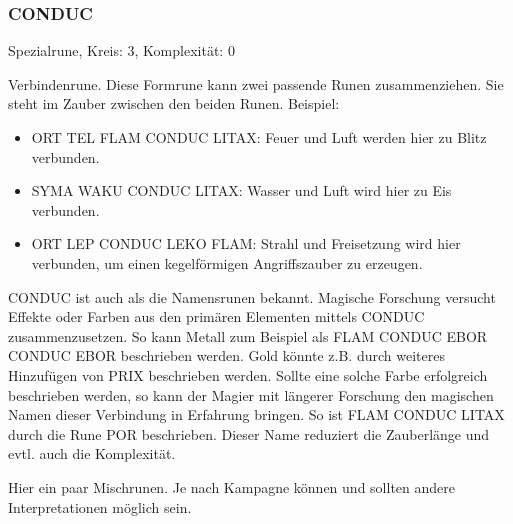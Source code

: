 \documentclass{article}
\begin{document}
\subsubsection{CONDUC}

Spezialrune, Kreis: 3, Komplexität: 0

Verbindenrune. Diese Formrune kann zwei passende Runen zusammenziehen. Sie steht im Zauber zwischen den beiden Runen.
Beispiel:

\begin{itemize}
\item ORT TEL FLAM CONDUC LITAX: Feuer und Luft werden hier zu Blitz verbunden.
\item SYMA WAKU CONDUC LITAX: Wasser und Luft wird hier zu Eis verbunden.
\item ORT LEP CONDUC LEKO FLAM: Strahl und Freisetzung wird hier verbunden, um einen kegelförmigen Angriffszauber zu erzeugen.
\end{itemize}

CONDUC ist auch als die Namensrunen bekannt. Magische Forschung versucht Effekte oder Farben aus den primären
Elementen mittels CONDUC zusammenzusetzen. So kann Metall zum Beispiel als FLAM CONDUC EBOR CONDUC EBOR beschrieben
werden. Gold könnte z.B. durch weiteres Hinzufügen von PRIX beschrieben werden. Sollte eine solche Farbe erfolgreich
beschrieben werden, so kann der Magier mit längerer Forschung den magischen Namen dieser Verbindung in Erfahrung
bringen. So ist FLAM CONDUC LITAX durch die Rune POR beschrieben. Dieser Name reduziert die Zauberlänge und evtl. auch
die Komplexität.

Hier ein paar Mischrunen. Je nach Kampagne können und sollten andere Interpretationen möglich sein.
\end{document}
